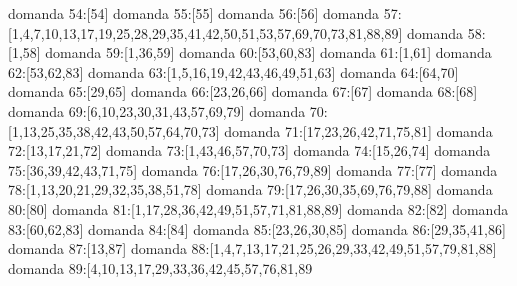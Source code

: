 domanda 54:[54]
domanda 55:[55]
domanda 56:[56]
domanda 57:[1,4,7,10,13,17,19,25,28,29,35,41,42,50,51,53,57,69,70,73,81,88,89]
domanda 58:[1,58]
domanda 59:[1,36,59]
domanda 60:[53,60,83]
domanda 61:[1,61]
domanda 62:[53,62,83]
domanda 63:[1,5,16,19,42,43,46,49,51,63]
domanda 64:[64,70]
domanda 65:[29,65]
domanda 66:[23,26,66]
domanda 67:[67]
domanda 68:[68]
domanda 69:[6,10,23,30,31,43,57,69,79]
domanda 70:[1,13,25,35,38,42,43,50,57,64,70,73]
domanda 71:[17,23,26,42,71,75,81]
domanda 72:[13,17,21,72]
domanda 73:[1,43,46,57,70,73]
domanda 74:[15,26,74]
domanda 75:[36,39,42,43,71,75]
domanda 76:[17,26,30,76,79,89]
domanda 77:[77]
domanda 78:[1,13,20,21,29,32,35,38,51,78]
domanda 79:[17,26,30,35,69,76,79,88]
domanda 80:[80]
domanda 81:[1,17,28,36,42,49,51,57,71,81,88,89]
domanda 82:[82]
domanda 83:[60,62,83]
domanda 84:[84]
domanda 85:[23,26,30,85]
domanda 86:[29,35,41,86]
domanda 87:[13,87]
domanda 88:[1,4,7,13,17,21,25,26,29,33,42,49,51,57,79,81,88]
domanda 89:[4,10,13,17,29,33,36,42,45,57,76,81,89

